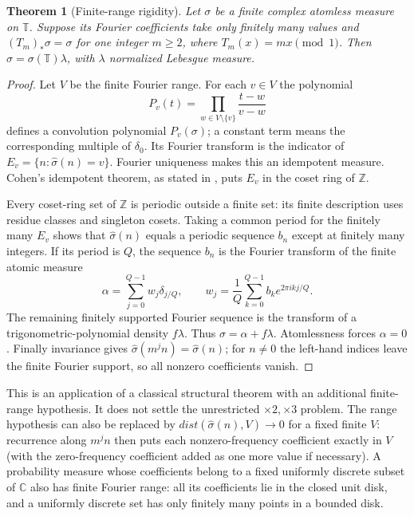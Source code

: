 \documentclass[11pt,a4paper]{article}
\newcommand{\Z}{\mathbb Z}
\newcommand{\C}{\mathbb C}
\newtheorem{theorem}{Theorem}[section]
\theoremstyle{definition}
\theoremstyle{remark}
\theoremstyle{plain}
\numberwithin{equation}{section}
\def\operatorname#1{#1}\def\mathrm#1{#1}}
\begin{document}
\begin{theorem}[Finite-range rigidity]\label{em:thm:finite-range}
Let $\sigma$ be a finite complex atomless measure on $\mathbb T$.
Suppose its Fourier coefficients take only finitely many values and
$(T_m)_*\sigma=\sigma$ for one integer $m\ge2$, where $T_m(x)=mx\pmod1$.
Then $\sigma=\sigma(\mathbb T)\lambda$, with $\lambda$ normalized
Lebesgue measure.
\end{theorem}
\begin{proof}
Let $V$ be the finite Fourier range. For each $v\in V$ the polynomial
\[
 P_v(t)=\prod_{w\in V\setminus\{v\}}\frac{t-w}{v-w}
\]
defines a convolution polynomial $P_v(\sigma)$; a constant term means
the corresponding multiple of $\delta_0$. Its Fourier transform is
the indicator of $E_v=\{n:\widehat\sigma(n)=v\}$. Fourier uniqueness
makes this an idempotent measure. Cohen's idempotent theorem, as
stated in \cite[Theorem 1.1]{GreenSanders}, puts $E_v$ in the coset ring of $\Z$.

Every coset-ring set of $\Z$ is periodic outside a finite set: its
finite description uses residue classes and singleton cosets. Taking
a common period for the finitely many $E_v$ shows that
$\widehat\sigma(n)$ equals a periodic sequence $b_n$ except at
finitely many integers. If its period is $Q$, the sequence $b_n$ is
the Fourier transform of the finite atomic measure
\[
 \alpha=\sum_{j=0}^{Q-1}w_j\delta_{j/Q},
 \qquad w_j=\frac1Q\sum_{k=0}^{Q-1}b_k e^{2\pi i kj/Q}.
\]
The remaining finitely supported Fourier sequence is the transform
of a trigonometric-polynomial density $f\lambda$. Thus
$\sigma=\alpha+f\lambda$. Atomlessness forces $\alpha=0$.
Finally invariance gives $\widehat\sigma(m^jn)=\widehat\sigma(n)$;
for $n\ne0$ the left-hand indices leave the finite Fourier support,
so all nonzero coefficients vanish.
\end{proof}

This is an application of a classical structural theorem with an
additional finite-range hypothesis. It does not settle the unrestricted
$\times2,\times3$ problem. The range hypothesis can also be replaced
by $\operatorname{dist}(\widehat\sigma(n),V)\to0$ for a fixed finite
$V$: recurrence along $m^jn$ then puts each nonzero-frequency
coefficient exactly in $V$ (with the zero-frequency coefficient added
as one more value if necessary). A probability measure whose coefficients
belong to a fixed uniformly discrete subset of $\C$ also has finite
Fourier range: all its coefficients lie in the closed unit disk, and a
uniformly discrete set has only finitely many points in a bounded disk.
\end{document}

